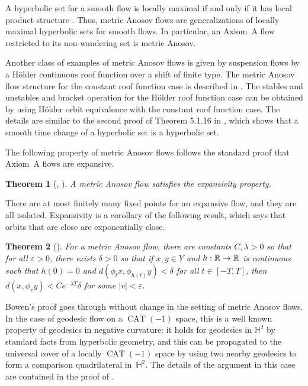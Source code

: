 \documentclass[10pt]{amsart}
\let\epsilon\varepsilon
\newtheorem{thm}{Theorem}[section]
\theoremstyle{definition}
\numberwithin{equation}{section}
\newcommand\R{\ifmmode{\mathbb R}\else{$\mathbb R$}\fi}
\DeclareMathOperator{\CAT}{CAT}
\begin{document}
A hyperbolic set for a smooth flow is locally maximal if and only if it has local product structure \cite[Th.\,6.2.7]{FH}. Thus, metric Anosov flows are generalizations of locally maximal hyperbolic sets for smooth flows. In particular, an Axiom~A flow restricted to its non-wandering set is metric Anosov.

Another class of examples of metric Anosov flows is given by suspension flows by a Hölder continuous roof function over a shift of finite type. The metric Anosov flow structure for the constant roof function case is described in \cite{pollicott}. The stables and unstables and bracket operation for the Hölder roof function case can be obtained by using Hölder orbit equivalence with the constant roof function case. The details are similar to the second proof of Theorem 5.1.16 in \cite[\S6.1]{FH}, which shows that a smooth time change of a hyperbolic set is a hyperbolic set.

The following property of metric Anosov flows follows the standard proof that Axiom~A flows are expansive.
\begin{thm}[{\cite[Cor.\,1.6]{bowen-symbolic}, \cite[Prop.\,1]{pollicott}}]
A metric Anosov flow satisfies the expansivity property.
\end{thm}
There are at most finitely many fixed points for an expansive flow, and they are all isolated. Expansivity is a corollary of the following result, which says that orbits that are close are exponentially close.

\begin{thm}[{\cite[Lem.\,1.5]{bowen-symbolic}}]\label{expclose}
For a metric Anosov flow, there are constants $C, \lambda>0$ so that for all $\epsilon>0$, there exists $\delta>0$ so that if $x,y \in Y$ and \hbox{$h: \R \to \R$} is continuous such that $h(0)=0$ and $d(\phi_t x, \phi_{h(t)} y) < \delta$ for all $t \in [-T, T]$, then $d(x, \phi_v y)< C e^{-\lambda T}\delta$ for some $|v| < \epsilon$.
\end{thm}

Bowen's proof goes through without change in the setting of metric Anosov flows. In the case of geodesic flow on a $\CAT(-1)$ space, this is a well known property of geodesics in negative curvature: it holds for geodesics in $\mathbb{H}^2$ by standard facts from hyperbolic geometry, and this can be propagated to the universal cover of a locally $\CAT(-1)$ space by using two nearby geodesics to form a comparison quadrilateral in~$\mathbb{H}^2$. The details of the argument in this case are contained in the proof of \cite[Prop.\,4.3]{CLT}.
\end{document}
